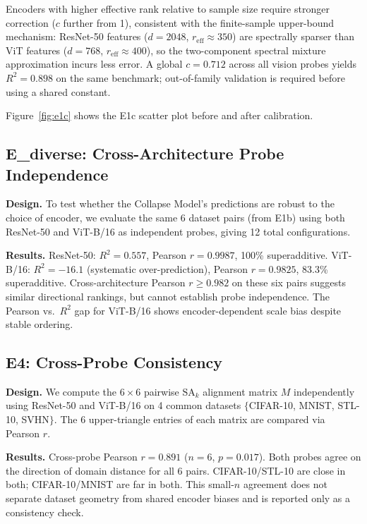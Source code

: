 \documentclass{article}
\newcommand{\reff}{\ensuremath{r_{\mathrm{eff}}}\xspace}
\newcommand{\SAk}{\ensuremath{\mathrm{SA}_k}\xspace}
\begin{document}
Encoders with higher effective rank relative to sample size
require stronger correction ($c$ further from 1),
consistent with the finite-sample upper-bound mechanism:
ResNet-50 features ($d{=}2048$, $\reff{\approx}350$) are spectrally
sparser than ViT features ($d{=}768$, $\reff{\approx}400$),
so the two-component spectral mixture approximation incurs less error.
A global $c{=}0.712$ across all vision probes
yields $R^2{=}0.898$ on the same benchmark; out-of-family validation is
required before using a shared constant.

Figure~\ref{fig:e1c} shows the E1c scatter plot before and after calibration.

\subsection{E\_diverse: Cross-Architecture Probe Independence}
\label{sec:ediverse}

\textbf{Design.}
To test whether the Collapse Model's predictions are robust to the choice of encoder,
we evaluate the same 6 dataset pairs (from E1b) using both ResNet-50 and ViT-B/16
as independent probes, giving 12 total configurations.

\textbf{Results.}
ResNet-50: $R^2=0.557$, Pearson $r=0.9987$, 100\% superadditive.
ViT-B/16: $R^2=-16.1$ (systematic over-prediction), Pearson $r=0.9825$, 83.3\% superadditive.
Cross-architecture Pearson $r\geq0.982$ on these six pairs suggests similar
directional rankings, but cannot establish probe independence.
The Pearson vs.\ $R^2$ gap for ViT-B/16 shows encoder-dependent scale bias
despite stable ordering.

\subsection{E4: Cross-Probe Consistency}
\label{sec:e4}

\textbf{Design.}
We compute the $6\times6$ pairwise $\SAk$ alignment matrix $M$ independently using
ResNet-50 and ViT-B/16 on 4 common datasets $\{$CIFAR-10, MNIST, STL-10, SVHN$\}$.
The 6 upper-triangle entries of each matrix are compared via Pearson $r$.

\textbf{Results.}
Cross-probe Pearson $r=0.891$ ($n=6$, $p=0.017$).
Both probes agree on the direction of domain distance for all 6 pairs.
CIFAR-10/STL-10 are close in both; CIFAR-10/MNIST are far in both.
This small-$n$ agreement does not separate dataset geometry from shared
encoder biases and is reported only as a consistency check.
\end{document}
